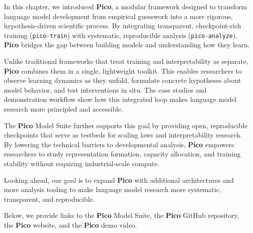 

In this chapter, we introduced \textbf{Pico}, a modular framework designed to transform language model development from empirical guesswork into a more rigorous, hypothesis-driven scientific process. By integrating transparent, checkpoint-rich training (\texttt{pico-train}) with systematic, reproducible analysis (\texttt{pico-analyze}), \textbf{Pico} bridges the gap between building models and understanding how they learn.

Unlike traditional frameworks that treat training and interpretability as separate, \textbf{Pico} combines them in a single, lightweight toolkit. This enables researchers to observe learning dynamics as they unfold, formulate concrete hypotheses about model behavior, and test interventions in situ. The case studies and demonstration workflow show how this integrated loop makes language model research more principled and accessible.

The \textbf{Pico} Model Suite further supports this goal by providing open, reproducible checkpoints that serve as testbeds for scaling laws and interpretability research. By lowering the technical barriers to developmental analysis, \textbf{Pico} empowers researchers to study representation formation, capacity allocation, and training stability without requiring industrial-scale compute.

Looking ahead, our goal is to expand \textbf{Pico} with additional architectures and more analysis tooling to make language model research more systematic, transparent, and reproducible.


\vspace{1em}
Below, we provide links to the \textbf{Pico} Model Suite, the \textbf{Pico} GitHub repository, the \textbf{Pico} website, and the \textbf{Pico} demo video.

